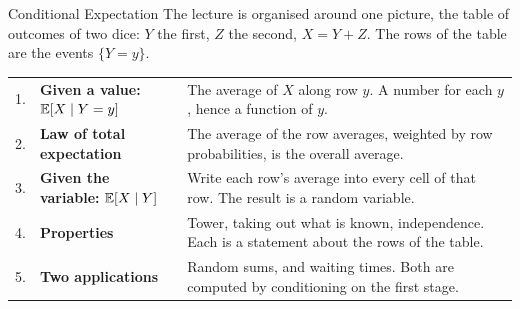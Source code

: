 \newcommand{\minitable}[2][0.42]{%
  \begin{tikzpicture}[x=#1cm,y=#1cm,font=\scriptsize]
    \foreach \y in {1,...,6}{\foreach \z in {1,...,6}{\dicecell{\y}{\z}{#2}}}
    \dicegrid
  \end{tikzpicture}}

\newcommand{\rowavgtable}[1][0.4]{%
  \begin{tikzpicture}[x=#1cm,y=#1cm,font=\scriptsize]
    \foreach \y in {1,...,6}{
      \pgfmathsetmacro{\g}{\y+3.5}
      \foreach \z in {1,...,6}{\dicecell{\y}{\z}{X}}
      \node[right,accent] at (6.6,-\y) {$\to\g$};
    }
    \dicegrid
    \foreach \y in {1,...,6}{\node[left,soft] at (0.4,-\y) {$y{=}\y$};}
  \end{tikzpicture}}

\begin{frame}{Conditional Expectation}
  \small
  The lecture is organised around one picture, the table of outcomes of two dice: $Y$ the first, $Z$ the second, $X=Y+Z$. The rows of the table are the events $\{Y=y\}$.
  \bigskip
  \renewcommand{\arraystretch}{1.8}
  \begin{tabular}{@{}r@{\ \ }>{\raggedright\arraybackslash}p{4.2cm}>{\raggedright\arraybackslash}p{8.6cm}@{}}
    1. & \textbf{Given a value:} $\mathbb{E}[X\mid Y=y]$ & The average of $X$ along row $y$. A number for each $y$, hence a function of $y$. \\
    2. & \textbf{Law of total expectation} & The average of the row averages, weighted by row probabilities, is the overall average. \\
    3. & \textbf{Given the variable:} $\mathbb{E}[X\mid Y]$ & Write each row's average into every cell of that row. The result is a random variable. \\
    4. & \textbf{Properties} & Tower, taking out what is known, independence. Each is a statement about the rows of the table. \\
    5. & \textbf{Two applications} & Random sums, and waiting times. Both are computed by conditioning on the first stage. \\
  \end{tabular}
\end{frame}

